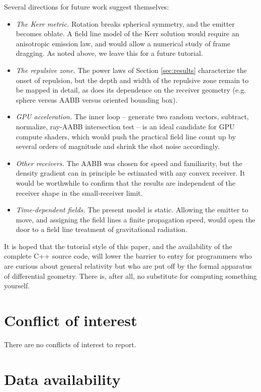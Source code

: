 \documentclass[10pt]{article}
\begin{document}
Several directions for future work suggest themselves:
\begin{itemize}
\item {\em The Kerr metric.} Rotation breaks spherical symmetry, and the emitter becomes oblate. A field line model of the Kerr solution would require an anisotropic emission law, and would allow a numerical study of frame dragging. As noted above, we leave this for a future tutorial.
\item {\em The repulsive zone.} The power laws of Section \ref{sec:results} characterize the onset of repulsion, but the depth and width of the repulsive zone remain to be mapped in detail, as does its dependence on the receiver geometry (e.g. sphere versus AABB versus oriented bounding box).
\item {\em GPU acceleration.} The inner loop -- generate two random vectors, subtract, normalize, ray-AABB intersection test -- is an ideal candidate for GPU compute shaders, which would push the practical field line count up by several orders of magnitude and shrink the shot noise accordingly.
\item {\em Other receivers.} The AABB was chosen for speed and familiarity, but the density gradient can in principle be estimated with any convex receiver. It would be worthwhile to confirm that the results are independent of the receiver shape in the small-receiver limit.
\item {\em Time-dependent fields.} The present model is static. Allowing the emitter to move, and assigning the field lines a finite propagation speed, would open the door to a field line treatment of gravitational radiation.
\end{itemize}

It is hoped that the tutorial style of this paper, and the availability of the complete C++ source code, will lower the barrier to entry for programmers who are curious about general relativity but who are put off by the formal apparatus of differential geometry.
There is, after all, no substitute for computing something yourself.




\section{Conflict of interest}

There are no conflicts of interest to report.




\section{Data availability}
\end{document}
